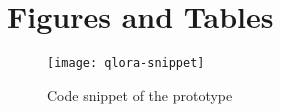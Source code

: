 %
%
%                 

\chapter{Figures and Tables}
\label{sec:appendixa}



%

\begin{figure}
	\caption{Code snippet of the prototype}
	\centering
	\texttt{[image: qlora-snippet]}
\end{figure}

